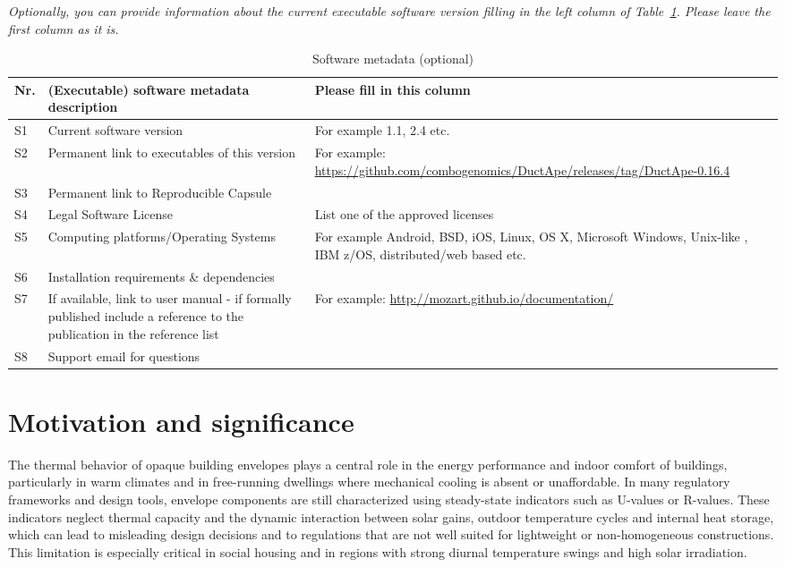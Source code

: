 \documentclass[preprint,12pt, a4paper]{elsarticle}
\begin{document}
\textit{Optionally, you can provide information about the current executable
software version filling in the left column of
Table~\ref{executabelMetadata}. Please leave the first column as it is.}

\begin{table}[!h]
\begin{tabular}{|l|p{6.5cm}|p{6.5cm}|}
\hline
\textbf{Nr.} & \textbf{(Executable) software metadata description} & \textbf{Please fill in this column} \\
\hline
S1 & Current software version & For example 1.1, 2.4 etc. \\
\hline
S2 & Permanent link to executables of this version  & For example: \url{https://github.com/combogenomics/DuctApe/releases/tag/DuctApe-0.16.4} \\
\hline
S3  & Permanent link to Reproducible Capsule & \\
\hline
S4 & Legal Software License & List one of the approved licenses \\
\hline
S5 & Computing platforms/Operating Systems & For example Android, BSD, iOS, Linux, OS X, Microsoft Windows, Unix-like , IBM z/OS, distributed/web based etc. \\
\hline
S6 & Installation requirements \& dependencies & \\
\hline
S7 & If available, link to user manual - if formally published include a reference to the publication in the reference list & For example: \url{http://mozart.github.io/documentation/} \\
\hline
S8 & Support email for questions & \\
\hline
\end{tabular}
\caption{Software metadata (optional)}
\label{executabelMetadata} 
\end{table}


\section{Motivation and significance}


The thermal behavior of opaque building envelopes plays a central role in the energy performance and indoor comfort of buildings, particularly in warm climates and in free-running dwellings where mechanical cooling is absent or unaffordable. In many regulatory frameworks and design tools, envelope components are still characterized using steady-state indicators such as U-values or R-values. These indicators neglect thermal capacity and the dynamic interaction between solar gains, outdoor temperature cycles and internal heat storage, which can lead to misleading design decisions and to regulations that are not well suited for lightweight or non-homogeneous constructions. This limitation is especially critical in social housing and in regions with strong diurnal temperature swings and high solar irradiation.
\end{document}
